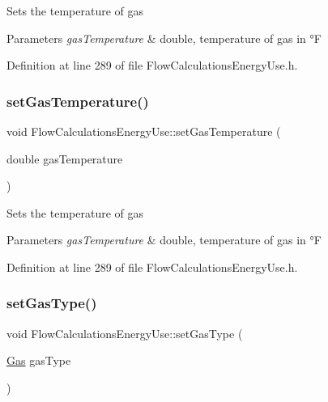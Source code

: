 Sets the temperature of gas


\begin{DoxyParams}{Parameters}
{\em gas\+Temperature} & double, temperature of gas in °F \\
\hline
\end{DoxyParams}


Definition at line 289 of file Flow\+Calculations\+Energy\+Use.\+h.

\mbox{\label{class_flow_calculations_energy_use_a80db5465d8a0354da31a7f90c759ea1f}} 
\subsubsection{\texorpdfstring{set\+Gas\+Temperature()}{setGasTemperature()}\hspace{0.1cm}{\footnotesize\ttfamily [3/3]}}
{\footnotesize\ttfamily void Flow\+Calculations\+Energy\+Use\+::set\+Gas\+Temperature (\begin{DoxyParamCaption}\item[{double}]{gas\+Temperature }\end{DoxyParamCaption})\hspace{0.3cm}{\ttfamily [inline]}}

Sets the temperature of gas


\begin{DoxyParams}{Parameters}
{\em gas\+Temperature} & double, temperature of gas in °F \\
\hline
\end{DoxyParams}


Definition at line 289 of file Flow\+Calculations\+Energy\+Use.\+h.

\mbox{\label{class_flow_calculations_energy_use_a01b38762426c50e6ab22aefd674f30df}} 
\subsubsection{\texorpdfstring{set\+Gas\+Type()}{setGasType()}\hspace{0.1cm}{\footnotesize\ttfamily [1/3]}}
{\footnotesize\ttfamily void Flow\+Calculations\+Energy\+Use\+::set\+Gas\+Type (\begin{DoxyParamCaption}\item[{\hyperlink{class_flow_calculations_energy_use_a840d5a836e7b05d6791b79bace4440f2}{Gas}}]{gas\+Type }\end{DoxyParamCaption})\hspace{0.3cm}{\ttfamily [inline]}}

